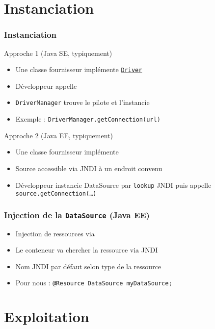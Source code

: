 \documentclass[english, french]{beamer}
\begin{document}
\section{Instanciation}
\begin{frame}
	\frametitle{Instanciation}
	\begin{block}{Approche 1 (Java SE, typiquement)}
		\begin{itemize}
			\item Une classe fournisseur implémente \href{https://docs.oracle.com/javase/8/docs/api/java/sql/Driver.html}{\texttt{Driver}}
			\item Développeur appelle 
			\item \texttt{DriverManager} trouve le pilote et l’instancie
			\item Exemple : \texttt{DriverManager.getConnection(url)}
		\end{itemize}
	\end{block}
	\begin{block}{Approche 2 (Java EE, typiquement)}
		\begin{itemize}
			\item Une classe fournisseur implémente 
			\item Source accessible via JNDI à un endroit convenu
			\item Développeur instancie DataSource par \texttt{lookup} JNDI puis appelle \texttt{source.getConnection(…)}
		\end{itemize}
	\end{block}
\end{frame}

\begin{frame}
	\frametitle{Injection de la \texttt{DataSource} (Java EE)}
	\begin{itemize}
		\item Injection de ressources via 
		\item Le conteneur va chercher la ressource via JNDI
		\item Nom JNDI par défaut selon type de la ressource
		\item Pour nous : \texttt{@Resource DataSource myDataSource;}
	\end{itemize}
\end{frame}

\section{Exploitation}
\end{document}
